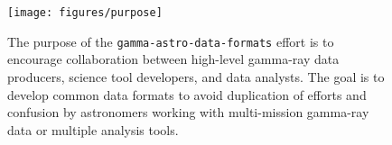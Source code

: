 \begin{figure}[tb]
\centerline{\texttt{[image: figures/purpose]}}
\caption{
The purpose of the \texttt{gamma-astro-data-formats} effort is to encourage collaboration between high-level gamma-ray data producers, science tool developers, and data analysts. The goal is to develop common data formats to avoid duplication of efforts and confusion by astronomers working with multi-mission gamma-ray data or multiple analysis tools.
}
\label{fig:purpose}
\end{figure}

\newpage
